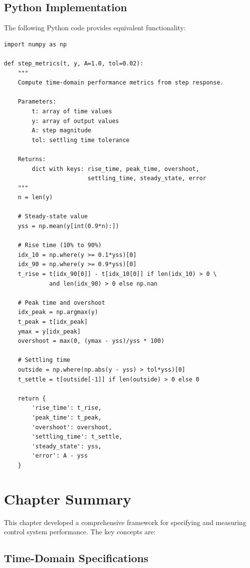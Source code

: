\subsection{Python Implementation}

The following Python code provides equivalent functionality:

\begin{verbatim}
import numpy as np

def step_metrics(t, y, A=1.0, tol=0.02):
    """
    Compute time-domain performance metrics from step response.

    Parameters:
        t: array of time values
        y: array of output values
        A: step magnitude
        tol: settling time tolerance

    Returns:
        dict with keys: rise_time, peak_time, overshoot,
                        settling_time, steady_state, error
    """
    n = len(y)

    # Steady-state value
    yss = np.mean(y[int(0.9*n):])

    # Rise time (10% to 90%)
    idx_10 = np.where(y >= 0.1*yss)[0]
    idx_90 = np.where(y >= 0.9*yss)[0]
    t_rise = t[idx_90[0]] - t[idx_10[0]] if len(idx_10) > 0 \
             and len(idx_90) > 0 else np.nan

    # Peak time and overshoot
    idx_peak = np.argmax(y)
    t_peak = t[idx_peak]
    ymax = y[idx_peak]
    overshoot = max(0, (ymax - yss)/yss * 100)

    # Settling time
    outside = np.where(np.abs(y - yss) > tol*yss)[0]
    t_settle = t[outside[-1]] if len(outside) > 0 else 0

    return {
        'rise_time': t_rise,
        'peak_time': t_peak,
        'overshoot': overshoot,
        'settling_time': t_settle,
        'steady_state': yss,
        'error': A - yss
    }
\end{verbatim}


\section{Chapter Summary}
\label{sec:ch5_summary}

This chapter developed a comprehensive framework for specifying and measuring control system performance. The key concepts are:

\subsection{Time-Domain Specifications}

